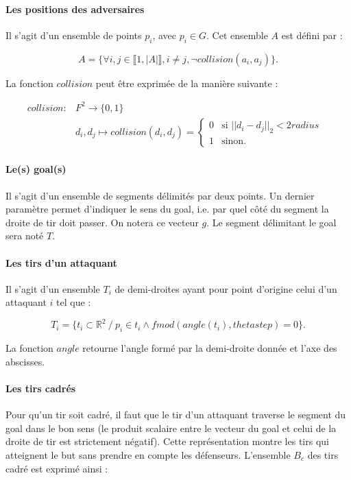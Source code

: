 \documentclass[12pt]{article}
\begin{document}
\paragraph{Les positions des adversaires} Il s'agit d'un ensemble de points $p_i$, avec $p_i \in G$. Cet ensemble $A$ est défini par :

\begin{equation*}
    A = \{ \forall i, j \in \llbracket 1, |A| \rrbracket, i \ne j, \neg collision(a_i, a_j) \}.
\end{equation*}

La fonction $collision$ peut être exprimée de la manière suivante :

\begin{align*}
  collision \colon &F^2 \to \{0, 1 \}\\
  &d_i, d_j \mapsto collision(d_i, d_j) = \begin{cases}
                                   0 & \text{si $|| d_i - d_j ||_2 < 2radius$ } \\
                                   1 & \text{sinon.}
  \end{cases}
\end{align*}

\paragraph{Le(s) goal(s)} Il s'agit d'un ensemble de segments délimités par deux points. Un dernier paramètre permet d'indiquer le sens du goal, i.e. par quel \og côté \fg{} du segment la droite de tir doit passer. On notera ce vecteur $g$. Le segment délimitant le goal sera noté $T$.

\paragraph{Les tirs d'un attaquant} Il s'agit d'un ensemble $T_i$ de demi-droites ayant pour point d'origine celui d'un attaquant $i$ tel que :

\begin{equation*}
    T_i = \{ t_i \subset \mathbb{R}^2 \ / \ p_i \in t_i \wedge fmod(angle(t_i), thetastep) = 0 \}.
\end{equation*}

La fonction $angle$ retourne l'angle formé par la demi-droite donnée et l'axe des abscisses.

\paragraph{Les tirs cadrés}
Pour qu'un tir soit cadré, il faut que le tir d'un attaquant traverse le segment du goal dans le bon sens (le produit scalaire entre le vecteur du goal et celui de la droite de tir est strictement négatif). Cette représentation montre les tirs qui atteignent le but sans prendre en compte les défenseurs. L'ensemble $B_c$ des tirs cadré est exprimé ainsi :
\end{document}
